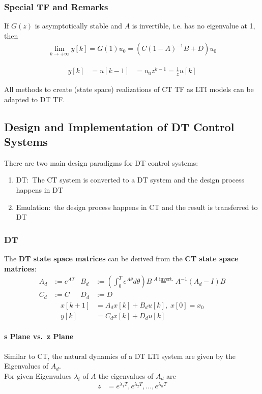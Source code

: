 \subsubsection{Special TF and Remarks}

If $G(z)$ is asymptotically stable and $A$ is invertible, i.e. has no eigenvalue at 1, then
\noindent\begin{align*}
    \lim_{k\to+\infty}y[k]=G(1)u_0=(C{(1-A)}^{-1}B+D)u_0
\end{align*}
%

\noindent\begin{align*}
    y[k] & =u[k-1] & =u_0z^{k-1}=\frac1zu[k]
\end{align*}

All methods to create (state space) realizations of CT TF as LTI models can be adapted to DT TF.\
%
%
\subsection{Design and Implementation of DT Control Systems}
There are two main design paradigms for DT control systems:
\begin{enumerate}
    \item DT:\ The CT system is converted to a DT system and the design process happens in DT
    \item Emulation:\ the design process happens in CT and the result is transferred to DT
\end{enumerate}
\subsubsection{DT}
The \textbf{DT state space matrices} can be derived from the \textbf{CT state space matrices}:
\noindent\begin{align*}
    A_d & :=e^{AT} & B_d & :=\left(\int_0^T {e^{A\theta}}d\theta\right)B \overset{A \text{ invert.}}{=} A^{-1}\left(A_d-I\right)B \\
    C_d & :=C      & D_d & :=D
\end{align*}
\noindent\begin{align*}
    x[k+1] & =A_d x[k]+B_d u[k], \; x[0]=x_0 \\
    y[k]   & =C_d x[k]+D_d u[k]
\end{align*}
\paragraph{s Plane vs.\ z Plane}
Similar to CT, the natural dynamics of a DT LTI system are given by the Eigenvalues of $A_d$.\\
For given Eigenvalues $\lambda_i$ of $A$ the eigenvalues of $A_d$ are
\noindent\begin{align*}
    z & =e^{\lambda_1T},e^{\lambda_2T},\ldots,e^{\lambda_{n}T}
\end{align*}


